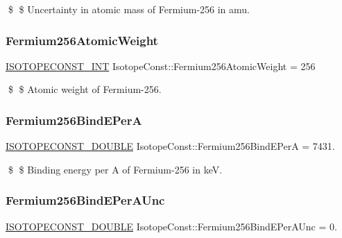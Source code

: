 \$ \$ Uncertainty in atomic mass of Fermium-\/256 in amu. \mbox{\label{group___isotope_const-_fermium-_fm256_ga61910faf40c23b3f0e65b3cf00aecc47}} 
\subsubsection{\texorpdfstring{Fermium256\+Atomic\+Weight}{Fermium256AtomicWeight}}
{\footnotesize\ttfamily \mbox{\hyperlink{group___isotope_const-_macros_ga5f18360b3e99483a35c32d789e62621c}{I\+S\+O\+T\+O\+P\+E\+C\+O\+N\+S\+T\+\_\+\+I\+NT}} Isotope\+Const\+::\+Fermium256\+Atomic\+Weight = 256}

\$ \$ Atomic weight of Fermium-\/256. \mbox{\label{group___isotope_const-_fermium-_fm256_ga14585ac010283b4ffceccb2ce6a67dc3}} 
\subsubsection{\texorpdfstring{Fermium256\+Bind\+E\+PerA}{Fermium256BindEPerA}}
{\footnotesize\ttfamily \mbox{\hyperlink{group___isotope_const-_macros_ga8f45a7272ce02c0b4c65c44636ed719a}{I\+S\+O\+T\+O\+P\+E\+C\+O\+N\+S\+T\+\_\+\+D\+O\+U\+B\+LE}} Isotope\+Const\+::\+Fermium256\+Bind\+E\+PerA = 7431.}

\$ \$ Binding energy per A of Fermium-\/256 in keV. \mbox{\label{group___isotope_const-_fermium-_fm256_ga13b6485c860f0ec4d3f31f64fb2eeded}} 
\subsubsection{\texorpdfstring{Fermium256\+Bind\+E\+Per\+A\+Unc}{Fermium256BindEPerAUnc}}
{\footnotesize\ttfamily \mbox{\hyperlink{group___isotope_const-_macros_ga8f45a7272ce02c0b4c65c44636ed719a}{I\+S\+O\+T\+O\+P\+E\+C\+O\+N\+S\+T\+\_\+\+D\+O\+U\+B\+LE}} Isotope\+Const\+::\+Fermium256\+Bind\+E\+Per\+A\+Unc = 0.}

